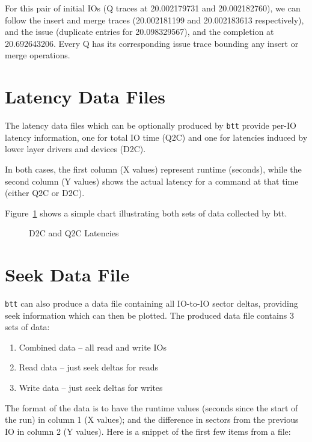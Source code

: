 \documentclass{article}
\begin{document}
  For this pair of initial IOs (Q traces at 20.002179731 and
  20.002182760), we can follow the insert and merge traces (20.002181199
  and 20.002183613 respectively), and the issue (duplicate entries for
  20.098329567), and the completion at 20.692643206. Every Q has its
  corresponding issue trace bounding any insert or merge operations.

\newpage\section{\label{sec:lat}\label{sec:lat-q2c}\label{sec:lat-d2c}Latency Data Files}

  The latency data files which can be optionally produced by \texttt{btt}
  provide per-IO latency information, one for total IO time (Q2C) and
  one for latencies induced by lower layer drivers and devices (D2C).

  In both cases, the first column (X values) represent runtime (seconds),
  while the second column (Y values) shows the actual latency for a
  command at that time (either Q2C or D2C).

  Figure~\ref{fig:lat} shows a simple chart illustrating both sets of
  data collected by btt.

  \begin{figure}[hb]
  \leavevmode\centering
  \caption{\label{fig:lat}D2C and Q2C Latencies}
  \end{figure}

\newpage\section{\label{sec:seek}Seek Data File}

  \texttt{btt} can also produce a data file containing all IO-to-IO sector
  deltas, providing seek information which can then be plotted. The
  produced data file contains 3 sets of data:

  \begin{enumerate}
     \item Combined data -- all read and write IOs

     \item Read data -- just seek deltas for reads

     \item Write data -- just seek deltas for writes
  \end{enumerate}

  The format of the data is to have the runtime values (seconds since
  the start of the run) in column 1 (X values); and the difference in
  sectors from the previous IO in column 2 (Y values). Here is a snippet
  of the first few items from a file:
\end{document}
